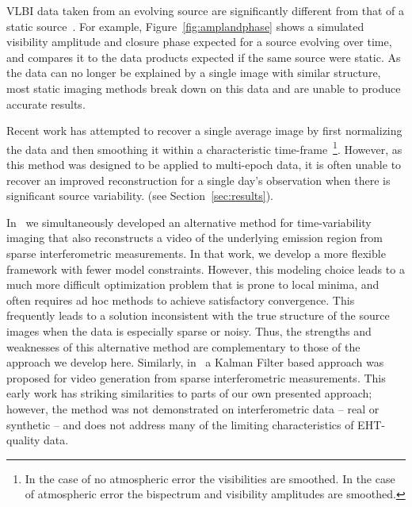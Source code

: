 VLBI data taken from an evolving source are significantly different from that of a static source~\cite{flaring, freek}. 
For example, Figure~\ref{fig:amplandphase} shows a simulated visibility amplitude and closure phase expected for a source evolving over time, and compares it to the data products expected if the same source were static.
As the data can no longer be explained by a single image with similar structure, most static imaging methods break down on this data and are unable to produce accurate results.

Recent work has attempted 
to recover a single average image by first normalizing the data and then smoothing it within a characteristic time-frame~\cite{freek}\footnote{In the case of no atmospheric error the visibilities are smoothed. In the case of atmospheric error the bispectrum and visibility amplitudes are smoothed.}. However, as this method was designed to be applied to multi-epoch data, it is often unable to recover an improved reconstruction for a single day's observation when there is significant source variability. (see Section~\ref{sec:results}). 

In~\cite{Johnson_dynamical} we simultaneously developed an alternative method for time-variability imaging that also reconstructs a video of the underlying emission region from sparse interferometric measurements. 
In that work, we develop a more flexible framework with fewer model constraints. However, this modeling choice leads to a much more difficult optimization problem that is prone to local minima, and often requires ad hoc methods to achieve satisfactory convergence.
This frequently leads to a solution inconsistent with the true structure of the source images when the data is especially sparse or noisy. Thus, the strengths and weaknesses of this alternative method are complementary to those of the approach we develop here. Similarly, in~\cite{anderson1979optimal} a Kalman Filter based approach was proposed for video generation from sparse interferometric measurements. This early work has striking similarities to parts of our own presented approach; however, the method was not demonstrated on interferometric data -- real or synthetic -- and does not address many of the limiting characteristics of EHT-quality data. 

